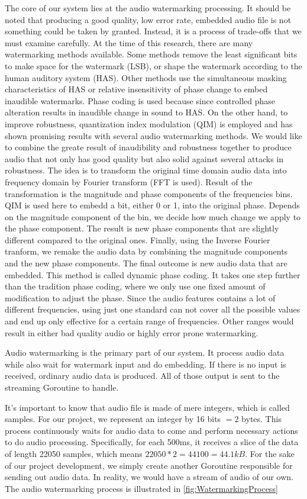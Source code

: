 The core of our system lies at the audio watermarking processing. It should be noted that producing a good quality, low error rate, embedded audio file is not something could be taken by granted. Instead, it is a process of trade-offs that we must examine carefully. At the time of this research, there are many watermarking methods available. Some methods remove the least significant bits to make space for the watermark (LSB), or shape the watermark according to the human auditory system (HAS). Other methods use the simultaneous masking characteristics of HAS or relative insensitivity of phase change to embed inaudible watermarks. Phase coding is used because since controlled phase alteration results in inaudible change in sound to HAS. On the other hand, to improve robustness, quantization index modulation (QIM) is employed and has shown promising results with several audio watermarking methods. We would like to combine the greate result of inaudibility and robustness together to produce audio that not only has good quality but also solid against several attacks in robustness. The idea is to transform the original time domain audio data into frequency domain by Fourier transform (FFT is used). Result of the transformation is the magnitude and phase components of the frequencies bins. QIM is used here to embedd a bit, either 0 or 1, into the original phase. Depends on the magnitude component of the bin, we decide how much change we apply to the phase component. The result is new phase components that are slightly different compared to the original ones. Finally, using the Inverse Fourier tranform, we remake the audio data by combining the magnitude components and the new phase components. The final outcome is new audio data that are embedded. This method is called dynamic phase coding. It takes one step further than the tradition phase coding, where we only use one fixed amount of modification to adjust the phase. Since the audio features contains a lot of different frequencies, using just one standard can not cover all the possible values and end up only effective for a certain range of frequencies. Other ranges would result in either bad quality audio or highly error prone watermarking. 

Audio watermarking is the primary part of our system. It process audio data while also wait for watermark input and do embedding. If there is no input is received, ordinary audio data is produced. All of those output is sent to the streaming Goroutine to handle.

It’s important to know that audio file is made of mere integers, which is called samples. For our project, we represent an integer by 16 bits \(=2\) bytes. This process continuously waits for audio data to come  and perform necessary actions to do audio processing. Specifically, for each 500ms, it receives a slice of the data of length 22050 samples, which means \(22050*2=44100=44.1kB\). For the sake of our project development, we simply create another Goroutine responsible for sending out audio data. In reality, we would have a stream of audio of our own. The audio watermarking process is illustrated in \ref{fig:WatermarkingProcess}

